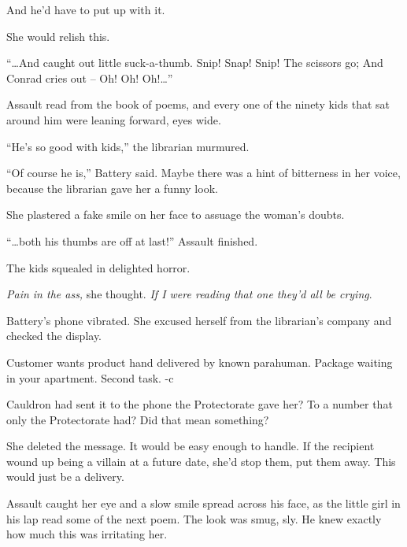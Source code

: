 And he'd have to put up with it.



She would relish this.



\sectionbreak



``\ldots{}And caught out little suck-a-thumb.
Snip!  Snap!  Snip!  The scissors go;
And Conrad cries out – Oh! Oh! Oh!\ldots''



Assault read from the book of poems, and every one of the ninety kids that sat around him were leaning forward, eyes wide.



``He's so good with kids,'' the librarian murmured.



``Of course he is,'' Battery said.  Maybe there was a hint of bitterness in her voice, because the librarian gave her a funny look.



She plastered a fake smile on her face to assuage the woman's doubts.



``\ldots{}both his thumbs are off at last!''  Assault finished.



The kids squealed in delighted horror.



\emph{Pain in the ass, }she thought.  \emph{If I were reading that one they'd all be crying}.



Battery's phone vibrated.  She excused herself from the librarian's company and checked the display.



Customer wants product hand delivered by known parahuman.  Package waiting in your apartment.  Second task.  -c



Cauldron had sent it to the phone the Protectorate gave her?  To a number that only the Protectorate had?  Did that mean something?



She deleted the message.  It would be easy enough to handle.  If the recipient wound up being a villain at a future date, she'd stop them, put them away.  This would just be a delivery.



Assault caught her eye and a slow smile spread across his face, as the little girl in his lap read some of the next poem.  The look was smug, sly.  He knew exactly how much this was irritating her.



